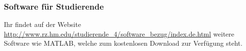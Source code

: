 \subsubsection{Software für Studierende} 
Ihr  findet auf der Website \url{http://www.rz.hm.edu/studierende_4/software_bezug/index.de.html} weitere Software wie MATLAB, welche zum kostenlosen Download zur Verfügung steht.
